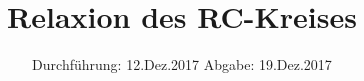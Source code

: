 

\subject{V353}
\title{Relaxion des RC-Kreises}
\date{%
  Durchführung: 12.Dez.2017
  \hspace{3em}
  Abgabe: 19.Dez.2017
}



\maketitle
\thispagestyle{empty}
\tableofcontents
\newpage






\printbibliography{}


